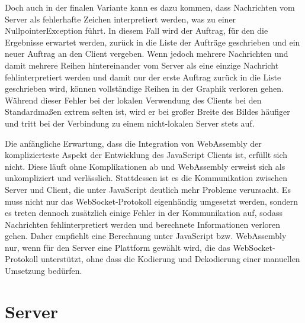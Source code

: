 \documentclass[12pt, onecolumn, notitlepage]{scrartcl}
\begin{document}
Doch auch in der finalen Variante kann es dazu kommen, dass Nachrichten vom Server als fehlerhafte Zeichen interpretiert werden, was zu einer NullpointerException führt. In diesem Fall wird der Auftrag, für den die Ergebnisse erwartet werden, zurück in die Liste der Aufträge geschrieben und ein neuer Auftrag an den Client vergeben. Wenn jedoch mehrere Nachrichten und damit mehrere Reihen hintereinander vom Server als eine einzige Nachricht fehlinterpretiert werden und damit nur der erste Auftrag zurück in die Liste geschrieben wird, können vollständige Reihen in der Graphik verloren gehen. Während dieser Fehler bei der lokalen Verwendung des Clients bei den Standardmaßen extrem selten ist, wird er bei großer Breite des Bildes häufiger und tritt bei der Verbindung zu einem nicht-lokalen Server stets auf. \par 

Die anfängliche Erwartung, dass die Integration von WebAssembly der komplizierteste Aspekt der Entwicklung des JavaScript Clients ist, erfüllt sich nicht. Diese läuft ohne Komplikationen ab und WebAssembly erweist sich als unkompliziert und verlässlich. Stattdessen ist es die Kommunikation zwischen Server und Client, die unter JavaScript deutlich mehr Probleme verursacht. Es muss nicht nur das WebSocket-Protokoll eigenhändig umgesetzt werden, sondern es treten dennoch zusätzlich einige Fehler in der Kommunikation auf, sodass Nachrichten fehlinterpretiert werden und berechnete Informationen verloren gehen. Daher empfiehlt eine Berechnung unter JavaScript bzw. WebAssembly nur, wenn für den Server eine Plattform gewählt wird, die das WebSocket-Protokoll unterstützt, ohne dass die Kodierung und Dekodierung einer manuellen Umsetzung bedürfen.


\section{Server}
\end{document}
